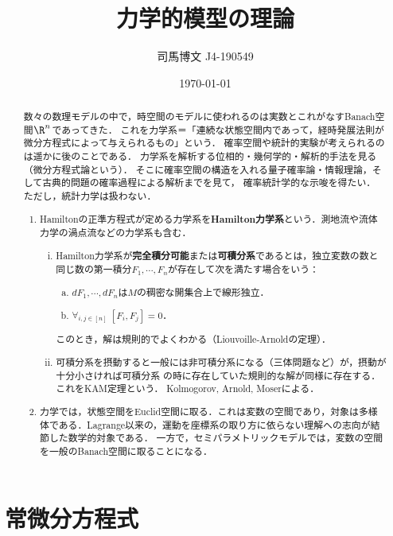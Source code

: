 \documentclass[uplatex,dvipdfmx]{jsreport}
\title{力学的模型の理論}
\author{司馬博文 J4-190549}
\date{\today}
\begin{document}
\tableofcontents

\begin{abstract}
    数々の数理モデルの中で，時空間のモデルに使われるのは実数とこれがなすBanach空間$\R^n$であってきた．
    これを力学系＝「連続な状態空間内であって，経時発展法則が微分方程式によって与えられるもの」という．
    確率空間や統計的実験が考えられるのは遥かに後のことである．
    力学系を解析する位相的・幾何学的・解析的手法を見る（微分方程式論という）．
    そこに確率空間の構造を入れる量子確率論・情報理論，そして古典的問題の確率過程による解析までを見て，
    確率統計学的な示唆を得たい．
    ただし，統計力学は扱わない．
    \begin{enumerate}
        \item Hamiltonの正準方程式が定める力学系を\textbf{Hamilton力学系}という．測地流や流体力学の渦点流などの力学系も含む．
        \begin{enumerate}[(i)]
            \item Hamilton力学系が\textbf{完全積分可能}または\textbf{可積分系}であるとは，独立変数の数と同じ数の第一積分$F_1,\cdots,F_n$が存在して次を満たす場合をいう：
            \begin{enumerate}[(a)]
                \item $dF_1,\cdots,dF_n$は$M$の稠密な開集合上で線形独立．
                \item $\forall_{i,j\in[n]}\;[F_i,F_j]=0$．
            \end{enumerate}
            このとき，解は規則的でよくわかる（Liouvoille-Arnoldの定理）．
            \item 可積分系を摂動すると一般には非可積分系になる（三体問題など）が，摂動が十分小さければ可積分系
            の時に存在していた規則的な解が同様に存在する．
            これをKAM定理という．
            Kolmogorov, Arnold, Moserによる．
        \end{enumerate}
        \item 力学では，状態空間をEuclid空間に取る．これは変数の空間であり，対象は多様体である．Lagrange以来の，運動を座標系の取り方に依らない理解への志向が結節した数学的対象である．
        一方で，セミパラメトリックモデルでは，変数の空間を一般のBanach空間に取ることになる．
    \end{enumerate}
\end{abstract}

\chapter{常微分方程式}
\end{document}
